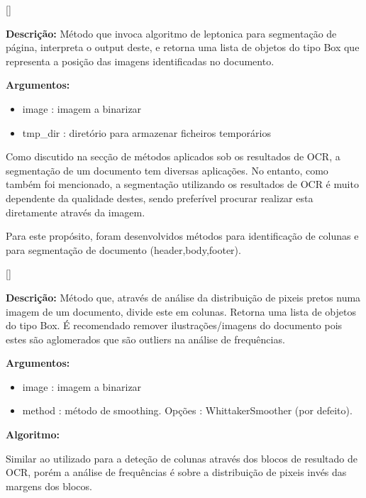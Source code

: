 
[\normalsize]

\textbf{Descrição:} Método que invoca algoritmo de leptonica para segmentação de página, interpreta o output deste, e retorna uma lista de objetos do tipo Box que representa a posição das imagens identificadas no documento.


\textbf{Argumentos:}
\begin{itemize}\setlength\itemsep{-0.3em}
	\item image : imagem a binarizar
	\item tmp\_dir : diretório para armazenar ficheiros temporários
\end{itemize}


\label{contribution_image_segmentation}

Como discutido na secção de métodos aplicados sob os resultados de OCR, a segmentação de um documento tem diversas aplicações. No entanto, como também foi mencionado, a segmentação utilizando os resultados de OCR é muito dependente da qualidade destes, sendo preferível procurar realizar esta diretamente através da imagem.

Para este propósito, foram desenvolvidos métodos para identificação de colunas e para segmentação de documento (header,body,footer).

[\normalsize]

\textbf{Descrição:} Método que, através de análise da distribuição de pixeis pretos numa imagem de um documento, divide este em colunas. Retorna uma lista de objetos do tipo Box.
É recomendado remover ilustrações/imagens do documento pois estes são aglomerados que são outliers na análise de frequências.

\textbf{Argumentos:}
\begin{itemize}\setlength\itemsep{-0.3em}
	\item image : imagem a binarizar
	\item method : método de smoothing. Opções : WhittakerSmoother (por defeito).
\end{itemize}

\textbf{Algoritmo:} 

Similar ao utilizado para a deteção de colunas através dos blocos de resultado de OCR, porém a análise de frequências é sobre a distribuição de pixeis invés das margens dos blocos.




